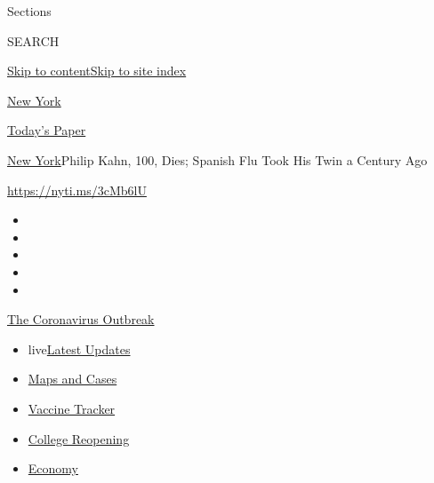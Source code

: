 Sections

SEARCH

\protect\hyperlink{site-content}{Skip to
content}\protect\hyperlink{site-index}{Skip to site index}

\href{https://www.nytimes3xbfgragh.onion/section/nyregion}{New York}

\href{https://myaccount.nytimes3xbfgragh.onion/auth/login?response_type=cookie\&client_id=vi}{}

\href{https://www.nytimes3xbfgragh.onion/section/todayspaper}{Today's
Paper}

\href{/section/nyregion}{New York}\textbar{}Philip Kahn, 100, Dies;
Spanish Flu Took His Twin a Century Ago

\url{https://nyti.ms/3cMb6lU}

\begin{itemize}
\item
\item
\item
\item
\item
\end{itemize}

\href{https://www.nytimes3xbfgragh.onion/news-event/coronavirus?action=click\&pgtype=Article\&state=default\&region=TOP_BANNER\&context=storylines_menu}{The
Coronavirus Outbreak}

\begin{itemize}
\tightlist
\item
  live\href{https://www.nytimes3xbfgragh.onion/2020/08/04/world/coronavirus-covid-19.html?action=click\&pgtype=Article\&state=default\&region=TOP_BANNER\&context=storylines_menu}{Latest
  Updates}
\item
  \href{https://www.nytimes3xbfgragh.onion/interactive/2020/us/coronavirus-us-cases.html?action=click\&pgtype=Article\&state=default\&region=TOP_BANNER\&context=storylines_menu}{Maps
  and Cases}
\item
  \href{https://www.nytimes3xbfgragh.onion/interactive/2020/science/coronavirus-vaccine-tracker.html?action=click\&pgtype=Article\&state=default\&region=TOP_BANNER\&context=storylines_menu}{Vaccine
  Tracker}
\item
  \href{https://www.nytimes3xbfgragh.onion/2020/08/02/us/covid-college-reopening.html?action=click\&pgtype=Article\&state=default\&region=TOP_BANNER\&context=storylines_menu}{College
  Reopening}
\item
  \href{https://www.nytimes3xbfgragh.onion/live/2020/08/03/business/stock-market-today-coronavirus?action=click\&pgtype=Article\&state=default\&region=TOP_BANNER\&context=storylines_menu}{Economy}
\end{itemize}

